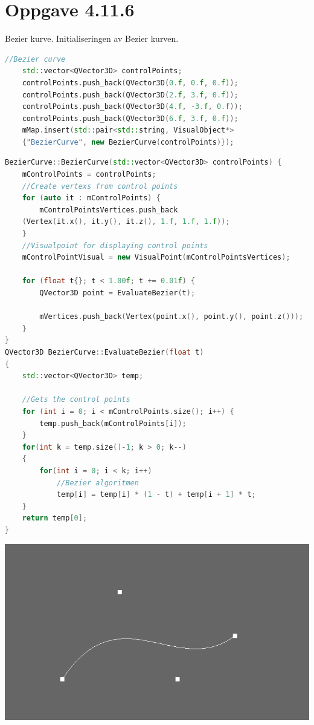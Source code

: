 \documentclass[a4paper,norsk]{article}
\begin{document}
\section{Oppgave 4.11.6}
Bezier kurve.
\newline
Initialiseringen av Bezier kurven.
\begin{lstlisting}[language=C++, caption={renderwindow.cpp}]
//Bezier curve
    std::vector<QVector3D> controlPoints;
    controlPoints.push_back(QVector3D(0.f, 0.f, 0.f));
    controlPoints.push_back(QVector3D(2.f, 3.f, 0.f));
    controlPoints.push_back(QVector3D(4.f, -3.f, 0.f));
    controlPoints.push_back(QVector3D(6.f, 3.f, 0.f));
    mMap.insert(std::pair<std::string, VisualObject*>
	{"BezierCurve", new BezierCurve(controlPoints)});
\end{lstlisting}
\begin{lstlisting}[language=C++, caption={beziercurve.cpp}]
BezierCurve::BezierCurve(std::vector<QVector3D> controlPoints) {
    mControlPoints = controlPoints;
    //Create vertexs from control points
    for (auto it : mControlPoints) {
        mControlPointsVertices.push_back
	(Vertex(it.x(), it.y(), it.z(), 1.f, 1.f, 1.f));
    }
    //Visualpoint for displaying control points
    mControlPointVisual = new VisualPoint(mControlPointsVertices);

    for (float t{}; t < 1.00f; t += 0.01f) {
        QVector3D point = EvaluateBezier(t);

        mVertices.push_back(Vertex(point.x(), point.y(), point.z()));
    }
}
QVector3D BezierCurve::EvaluateBezier(float t)
{
    std::vector<QVector3D> temp;

    //Gets the control points
    for (int i = 0; i < mControlPoints.size(); i++) {
        temp.push_back(mControlPoints[i]);
    }
    for(int k = temp.size()-1; k > 0; k--)
    {
        for(int i = 0; i < k; i++) 
            //Bezier algoritmen
            temp[i] = temp[i] * (1 - t) + temp[i + 1] * t;
    }
    return temp[0];
}
\end{lstlisting}
\centering
\includegraphics[width=\textwidth]{MatteOblig2BezierCurveImage}
\end{document}
